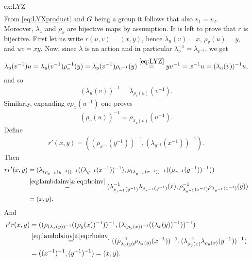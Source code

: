 \begin{sol}{ex:LYZ}
\begin{align*}
    \end{align*}
    From \eqref{eq:LYXproduct} and $G$ being a group it follows that also $v_1=v_2$.
    Moreover, $\lambda_x$ and $\rho_x$ are bijective maps by assumption. 
    It is left to prove that $r$ is bijective.
    First let us write $r(u,v)=(x,y)$, hence $\lambda_u(v)=x$, $\rho_v(u)=y$, and $uv=xy$. Now, since $\lambda$ is an action and in particular $\lambda^{-1}_v=\lambda_{v^{-1}}$, we get 
    \begin{align*}
        \lambda_y(v^{-1})u = \lambda_y(v^{-1})\rho^{-1}_v(y) = \lambda_y(v^{-1})\rho_{v^{-1}}(y) \overset{\eqref{eq:LYZ}}{=} yv^{-1} = x^{-1}u = (\lambda_u(v))^{-1}u,
    \end{align*}
    and so 
    \begin{align}\label{eq:lambdainv}
        (\lambda_u(v))^{-1}=\lambda_{\rho_v(u)}(v^{-1}).
    \end{align}
    Similarly, expanding $v\rho_x(u^{-1})$ one proves
    \begin{align}\label{eq:rhoinv}
        (\rho_v(u))^{-1}=\rho_{\lambda_u(v)}(u^{-1}).
    \end{align}
    Define
    \begin{align*}
        r'(x,y)=((\rho_{x^{-1}}(y^{-1}))^{-1},(\lambda_{y^{-1}}(x^{-1}))^{-1}).
    \end{align*}
    Then
    \begin{align*}
        rr'(x,y) &= (\lambda_{(\rho_{x^{-1}}(y^{-1}))^{-1}}((\lambda_{y^{-1}}(x^{-1}))^{-1}), \rho_{(\lambda_{y^{-1}}(x^{-1}))^{-1}}((\rho_{x^{-1}}(y^{-1}))^{-1}))\\
        &\overset{\eqref{eq:lambdainv}\&\eqref{eq:rhoinv}}{=}(\lambda^{-1}_{\rho_{x^{-1}}(y^{-1})}\lambda_{\rho_{x^{-1}}(y^{-1})}(x),\rho^{-1}_{\lambda_{y^{-1}}(x^{-1})}\rho_{\lambda_{y^{-1}}(x^{-1})}(y)) \\
        &=(x,y).
    \end{align*}
    And
    \begin{align*}
        r'r(x,y) &= ((\rho_{(\lambda_x(y))^{-1}}((\rho_y(x))^{-1}))^{-1},(\lambda_{(\rho_y(x))^{-1}}((\lambda_x(y))^{-1}))^{-1})\\
        &\overset{\eqref{eq:lambdainv}\&\eqref{eq:rhoinv}}{=} ( (\rho^{-1}_{\lambda_x(y)}\rho_{\lambda_x(y)}(x^{-1}))^{-1}, (\lambda^{-1}_{\rho_y(x)}\lambda_{\rho_y(x)}(y^{-1}))^{-1})\\
        &=((x^{-1})^{-1},(y^{-1})^{-1}) = (x,y).
    \end{align*}
\end{sol}